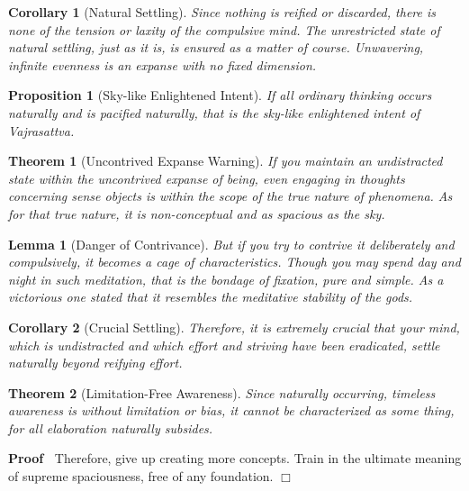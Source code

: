 \documentclass{article}
\newenvironment{proof}{\noindent\textbf{Proof\ }}{\hspace*{\fill}$\Box$\medskip}
\newtheorem{corollary}{Corollary}
\newtheorem{lemma}{Lemma}
\newtheorem{proposition}{Proposition}
{\theorembodyfont{\rmfamily}\newtheorem{remark}{Remark}}
\newtheorem{theorem}{Theorem}
\begin{document}
\begin{corollary}
  [Natural Settling] Since nothing is reified or discarded, there is none of
  the tension or laxity of the compulsive mind. The unrestricted state of
  natural settling, just as it is, is ensured as a matter of course.
  Unwavering, infinite evenness is an expanse with no fixed dimension.
\end{corollary}

\begin{proposition}
  [Sky-like Enlightened Intent] If all ordinary thinking occurs naturally and
  is pacified naturally, that is the sky-like enlightened intent of
  Vajrasattva.
\end{proposition}

\begin{theorem}
  [Uncontrived Expanse Warning] If you maintain an undistracted state within
  the uncontrived expanse of being, even engaging in thoughts concerning sense
  objects is within the scope of the true nature of phenomena. As for that
  true nature, it is non-conceptual and as spacious as the sky.
\end{theorem}

\begin{lemma}
  [Danger of Contrivance] But if you try to contrive it deliberately and
  compulsively, it becomes a cage of characteristics. Though you may spend day
  and night in such meditation, that is the bondage of fixation, pure and
  simple. As a victorious one stated that it resembles the meditative
  stability of the gods.
\end{lemma}

\begin{corollary}
  [Crucial Settling] Therefore, it is extremely crucial that your mind, which
  is undistracted and which effort and striving have been eradicated, settle
  naturally beyond reifying effort.
\end{corollary}

\begin{theorem}
  [Limitation-Free Awareness] Since naturally occurring, timeless awareness is
  without limitation or bias, it cannot be characterized as some thing, for
  all elaboration naturally subsides.
\end{theorem}

\begin{proof}
  Therefore, give up creating more concepts. Train in the ultimate meaning of
  supreme spaciousness, free of any foundation.
\end{proof}
\end{document}
